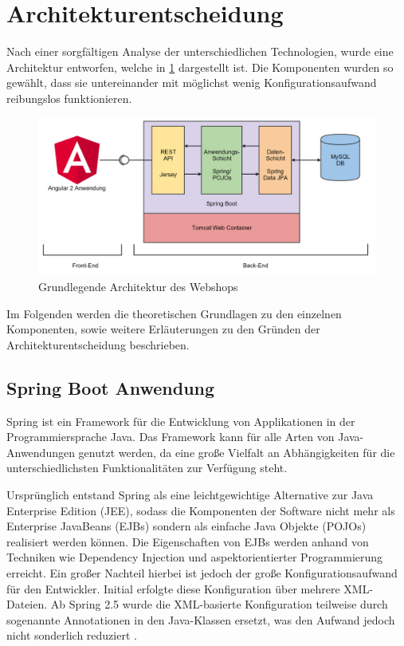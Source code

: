 \section{Architekturentscheidung}\label{arch_decission} \thispagestyle{nomarkstyle}
Nach einer sorgfältigen Analyse der unterschiedlichen Technologien, wurde eine Architektur entworfen, welche in \cref{fig:webshop_arch} dargestellt ist. Die Komponenten wurden so gewählt, dass sie untereinander mit möglichst wenig Konfigurationsaufwand reibungslos funktionieren. 

\begin{figure}[th!]
	\centering
	\includegraphics[width=\linewidth]{bilder/kap5/webshop_arch.png}
	\caption{Grundlegende Architektur des Webshops}
	\label{fig:webshop_arch}
\end{figure}

Im Folgenden werden die theoretischen Grundlagen zu den einzelnen Komponenten, sowie weitere Erläuterungen zu den Gründen der Architekturentscheidung beschrieben.

\subsection{Spring Boot Anwendung}
Spring ist ein Framework für die Entwicklung von Applikationen in der Programmiersprache Java.
Das Framework kann für alle Arten von Java-Anwendungen genutzt werden, da eine große Vielfalt an Abhängigkeiten für die unterschiedlichsten Funktionalitäten zur Verfügung steht.

Ursprünglich entstand Spring als eine leichtgewichtige Alternative zur Java Enterprise Edition (\acs{JEE}), sodass die Komponenten der Software nicht mehr als Enterprise JavaBeans (\acs{EJB}s) sondern als einfache Java Objekte (\acs{POJO}s) realisiert werden können.
Die Eigenschaften von \acs{EJB}s werden anhand von Techniken wie Dependency Injection und aspektorientierter Programmierung erreicht.
Ein großer Nachteil hierbei ist jedoch der große Konfigurationsaufwand für den Entwickler.
Initial erfolgte diese Konfiguration über mehrere \acs{XML}-Dateien. Ab Spring 2.5 wurde die \acs{XML}-basierte Konfiguration teilweise durch sogenannte Annotationen in den Java-Klassen ersetzt, was den Aufwand jedoch nicht sonderlich reduziert \cite{Walls2015}.

